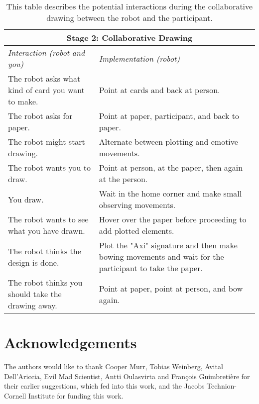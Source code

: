 \documentclass[sigconf,anonymous=false]{acmart}
\begin{document}
\begin{table}%
\centering
\begin{tabular}{ || m{13em} | m{12.5em} || } 
    \hline
    \multicolumn{2}{|c|}{\textbf{Stage 2: Collaborative Drawing}} \\
    \hline
     \textit{Interaction (robot and you)} & \textit{Implementation (robot)} \\
    \hline  
    The robot asks what kind of card you want to make. & Point at cards and back at person. \\ 
      \hline
      The robot asks for paper. & Point at paper, participant, and back to paper. \\ 
      \hline
      The robot might start drawing. & Alternate between plotting and emotive movements. \\ 
      \hline
      The robot wants you to draw. & Point at person, at the paper, then again at the person. \\ 
      \hline
      You draw. & Wait in the home corner and make small observing movements. \\ 
      \hline
      The robot wants to see what you have drawn. & Hover over the paper before proceeding to add plotted elements. \\ 
      \hline
      The robot thinks the design is done. & Plot the "Axi" signature and then make bowing movements and wait for the participant to take the paper. \\ 
      \hline
       The robot thinks you should take the drawing away. & Point at paper, point at person, and bow again. \\ 
      \hline      
    \end{tabular}
    \caption{This table describes the potential interactions during the collaborative drawing between the robot and the participant.}
    \label{tab:collaboration}
\end{table}

\vspace{-.1in}
\section{Acknowledgements}
The authors would like to thank Cooper Murr, Tobias Weinberg, Avital Dell'Ariccia, Evil Mad Scientist, Antti Oulasvirta and François Guimbretière for their earlier suggestions, which fed into this work, and the Jacobs Technion-Cornell Institute for funding this work.



\end{document}
